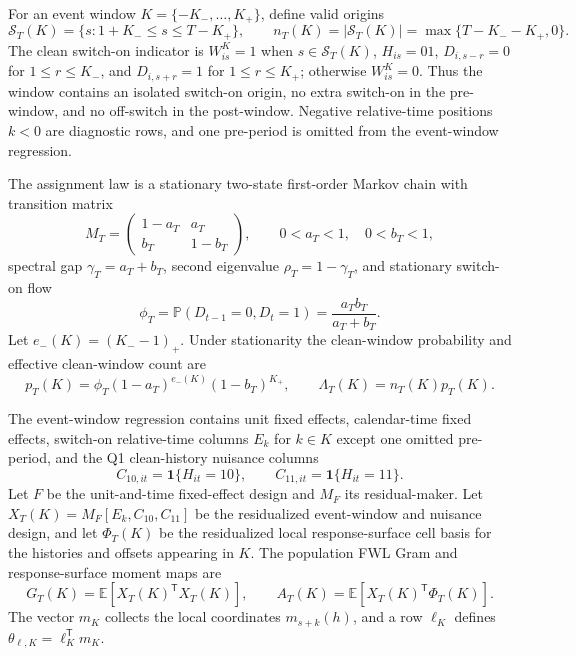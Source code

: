 \documentclass[11pt]{article}
\newcommand{\E}{\mathbb{E}}
\renewcommand{\Pr}{\mathbb{P}}
\newcommand{\one}{\mathbf{1}}
\newcommand{\transpose}{\mathsf{T}}
\theoremstyle{definition}
\theoremstyle{plain}
\theoremstyle{remark}
\begin{document}
For an event window \(K=\{-K_-,\ldots,K_+\}\), define valid origins
\[
\mathcal S_T(K)=\{s:1+K_-\le s\le T-K_+\},
\qquad
n_T(K)=|\mathcal S_T(K)|=\max\{T-K_- -K_+,0\}.
\]
The clean switch-on indicator is \(W_{is}^K=1\) when \(s\in\mathcal S_T(K)\), \(H_{is}=01\), \(D_{i,s-r}=0\) for \(1\le r\le K_-\), and \(D_{i,s+r}=1\) for \(1\le r\le K_+\); otherwise \(W_{is}^K=0\).
Thus the window contains an isolated switch-on origin, no extra switch-on in the pre-window, and no off-switch in the post-window.
Negative relative-time positions \(k<0\) are diagnostic rows, and one pre-period is omitted from the event-window regression.

The assignment law is a stationary two-state first-order Markov chain with transition matrix
\[
M_T=\begin{pmatrix}1-a_T&a_T\\ b_T&1-b_T\end{pmatrix},
\qquad
0<a_T<1,\quad 0<b_T<1,
\]
spectral gap \(\gamma_T=a_T+b_T\), second eigenvalue \(\rho_T=1-\gamma_T\), and stationary switch-on flow
\[
\phi_T=\Pr(D_{t-1}=0,D_t=1)=\frac{a_Tb_T}{a_T+b_T}.
\]
Let \(e_-(K)=(K_- -1)_+\).  Under stationarity the clean-window probability and effective clean-window count are
\[
p_T(K)=\phi_T(1-a_T)^{e_-(K)}(1-b_T)^{K_+},
\qquad
\Lambda_T(K)=n_T(K)p_T(K).
\]

The event-window regression contains unit fixed effects, calendar-time fixed effects, switch-on relative-time columns \(E_k\) for \(k\in K\) except one omitted pre-period, and the Q1 clean-history nuisance columns
\[
C_{10,it}=\one\{H_{it}=10\},\qquad C_{11,it}=\one\{H_{it}=11\}.
\]
Let \(F\) be the unit-and-time fixed-effect design and \(M_F\) its residual-maker.
Let \(X_T(K)=M_F[E_k,C_{10},C_{11}]\) be the residualized event-window and nuisance design, and let \(\Phi_T(K)\) be the residualized local response-surface cell basis for the histories and offsets appearing in \(K\).
The population FWL Gram and response-surface moment maps are
\[
G_T(K)=\E[X_T(K)^\transpose X_T(K)],\qquad
A_T(K)=\E[X_T(K)^\transpose \Phi_T(K)].
\]
The vector \(m_K\) collects the local coordinates \(m_{s+k}(h)\), and a row \(\ell_K\) defines \(\theta_{\ell,K}=\ell_K^\transpose m_K\).
\end{document}
